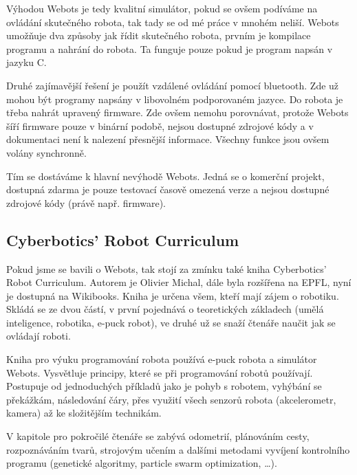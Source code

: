 \documentclass[12pt,notitlepage]{report}
\begin{document}
        Výhodou Webots je tedy kvalitní simulátor, pokud se ovšem podíváme na
        ovládání skutečného robota, tak tady se od mé práce v mnohém neliší.
        Webots umožňuje dva způsoby jak řídit skutečného robota, prvním je
        kompilace programu a nahrání do robota. Ta funguje pouze pokud je
        program napsán v jazyku C.

        Druhé zajímavější řešení je použít vzdálené ovládání pomocí
        bluetooth. Zde už mohou být programy napsány v libovolném podporovaném
        jazyce. Do robota je třeba nahrát upravený firmware. Zde ovšem nemohu
        porovnávat, protože Webots šíří firmware pouze v binární podobě, nejsou
        dostupné zdrojové kódy a v dokumentaci není k nalezení přesnější
        informace. Všechny funkce jsou ovšem volány synchronně.

        Tím se dostáváme k hlavní nevýhodě Webots. Jedná se o komerční projekt,
        dostupná zdarma je pouze testovací časově omezená verze a nejsou
        dostupné zdrojové kódy (právě např. firmware).

        \subsection{Cyberbotics' Robot Curriculum}
        \label{curriculum}

        Pokud jsme se bavili o Webots, tak stojí za zmínku také kniha
        Cyberbotics' Robot Curriculum\cite{cyberbotics}. Autorem je Olivier
        Michal, dále byla rozšířena na EPFL, nyní je dostupná na
        Wikibooks\cite{wikibooks}. Kniha je určena všem, kteří mají zájem o
        robotiku. Skládá se ze dvou částí, v první pojednává o teoretických
        základech (umělá inteligence, robotika, e-puck robot), ve druhé už se
        snaží čtenáře naučit jak se ovládají roboti.

        Kniha pro výuku programování robota používá e-puck robota a simulátor
        Webots. Vysvětluje principy, které se při programování robotů
        používají. Postupuje od jednoduchých příkladů jako je pohyb s robotem,
        vyhýbání se překážkám, následování čáry, přes využití všech senzorů
        robota (akcelerometr, kamera) až ke složitějším technikám.

        V kapitole pro pokročilé čtenáře se zabývá odometrií, plánováním cesty,
        rozpoznáváním tvarů, strojovým učením a dalšími metodami vyvíjení
        kontrolního programu (genetické algoritmy, particle swarm optimization,
        \ldots).
\end{document}
